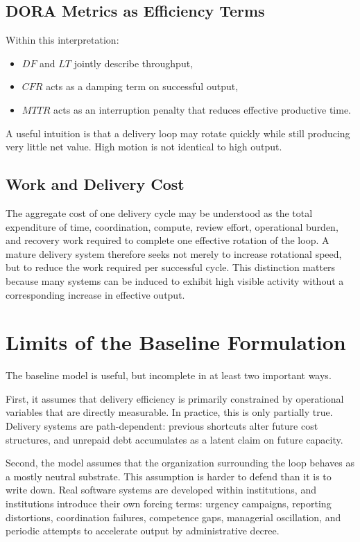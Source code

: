 \documentclass[letterpaper]{article}
\begin{document}
\subsection{DORA Metrics as Efficiency Terms}

Within this interpretation:
\begin{itemize}
    \item $DF$ and $LT$ jointly describe throughput,
    \item $CFR$ acts as a damping term on successful output,
    \item $MTTR$ acts as an interruption penalty that reduces effective productive time.
\end{itemize}

A useful intuition is that a delivery loop may rotate quickly while still producing very little net value. High motion is not identical to high output.

\subsection{Work and Delivery Cost}

The aggregate cost of one delivery cycle may be understood as the total expenditure of time, coordination, compute, review effort, operational burden, and recovery work required to complete one effective rotation of the loop. A mature delivery system therefore seeks not merely to increase rotational speed, but to reduce the work required per successful cycle.
This distinction matters because many systems can be induced to exhibit high visible activity without a corresponding increase in effective output.

\section{Limits of the Baseline Formulation}

The baseline model is useful, but incomplete in at least two important ways.

First, it assumes that delivery efficiency is primarily constrained by operational variables that are directly measurable. In practice, this is only partially true. Delivery systems are path-dependent: previous shortcuts alter future cost structures, and unrepaid debt accumulates as a latent claim on future capacity.

Second, the model assumes that the organization surrounding the loop behaves as a mostly neutral substrate. This assumption is harder to defend than it is to write down. Real software systems are developed within institutions, and institutions introduce their own forcing terms: urgency campaigns, reporting distortions, coordination failures, competence gaps, managerial oscillation, and periodic attempts to accelerate output by administrative decree.
\end{document}
